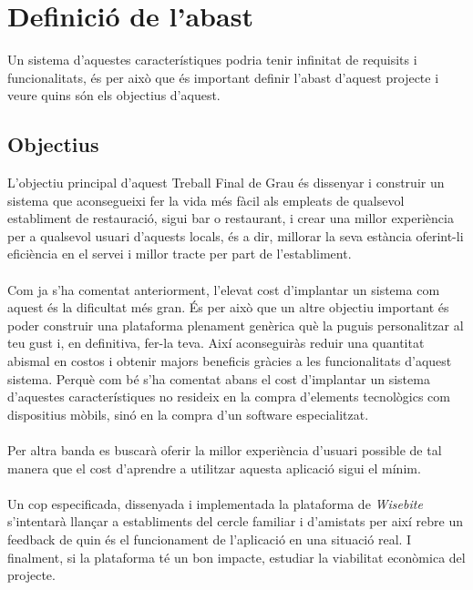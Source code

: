 
\chapter{Definició de l'abast} %

\label{Chapter3} %

Un sistema d'aquestes característiques podria tenir infinitat de requisits i funcionalitats, és per això que és important definir l'abast d'aquest projecte i veure quins són els objectius d'aquest.


\section{Objectius}

L'objectiu principal d'aquest Treball Final de Grau és dissenyar i construir un sistema que aconsegueixi fer la vida més fàcil als empleats de qualsevol establiment de restauració, sigui bar o restaurant, i crear una millor experiència per a qualsevol usuari d'aquests locals, és a dir, millorar la seva estància oferint-li eficiència en el servei i millor tracte per part de l'establiment.
\\\\
Com ja s'ha comentat anteriorment, l'elevat cost d'implantar un sistema com aquest és la dificultat més gran. És per això que un altre objectiu important és poder construir una plataforma plenament genèrica què la puguis personalitzar al teu gust i, en definitiva, fer-la teva. Així aconseguiràs reduir una quantitat abismal en costos i obtenir majors beneficis gràcies a les funcionalitats d'aquest sistema. Perquè com bé s'ha comentat abans el cost d'implantar un sistema d'aquestes característiques no resideix en la compra d'elements tecnològics com dispositius mòbils, sinó en la compra d'un software especialitzat.
\\\\
Per altra banda es buscarà oferir la millor experiència d'usuari possible de tal manera que el cost d'aprendre a utilitzar aquesta aplicació sigui el mínim.
\\\\
Un cop especificada, dissenyada i implementada la plataforma de \textit{Wisebite} s'intentarà llançar a establiments del cercle familiar i d'amistats per així rebre un feedback de quin és el funcionament de l'aplicació en una situació real. I finalment, si la plataforma té un bon impacte, estudiar la viabilitat econòmica del projecte.

